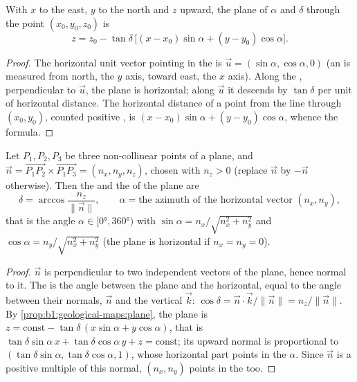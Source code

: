 \begin{proposition}\label{prop:b1:geological-maps:plane}
With $x$ to the east, $y$ to the north and $z$ upward, the plane of  $\alpha$ and  $\delta$ through the point $(x_0, y_0, z_0)$ is
\[
  z = z_0 - \tan\delta\,\bigl[(x - x_0)\sin\alpha + (y - y_0)\cos\alpha\bigr].
\]
\end{proposition}

\begin{proof}
The horizontal unit vector pointing in the  is
$\vec u = (\sin\alpha, \cos\alpha, 0)$ (an  is measured from north,
the $y$ axis, toward east, the $x$ axis). Along the , perpendicular to
$\vec u$, the plane is horizontal; along $\vec u$ it descends by
$\tan\delta$ per unit of horizontal distance. The horizontal distance of a
point from the  line through $(x_0, y_0)$, counted positive ,
is $(x-x_0)\sin\alpha + (y-y_0)\cos\alpha$, whence the formula.
\end{proof}

\begin{theorem}\label{thm:b1:geological-maps:three-point}
Let $P_1, P_2, P_3$ be three non-collinear points of a plane, and
$\vec n = \overrightarrow{P_1P_2} \times \overrightarrow{P_1P_3} =
(n_x, n_y, n_z)$, chosen with $n_z > 0$ (replace $\vec n$ by $-\vec n$
otherwise). Then the  and the  of the plane are
\[
  \delta = \arccos\frac{n_z}{\|\vec n\|}, \qquad
  \alpha = \text{the azimuth of the horizontal vector } (n_x, n_y),
\]
that is the angle $\alpha \in [\ang{0}, \ang{360})$ with
$\sin\alpha = n_x/\sqrt{n_x^2+n_y^2}$ and $\cos\alpha = n_y/\sqrt{n_x^2+n_y^2}$
(the plane is horizontal if $n_x = n_y = 0$).
\end{theorem}

\begin{proof}
$\vec n$ is perpendicular to two independent vectors of the plane, hence
normal to it. The  is the angle between the plane and the horizontal,
equal to the angle between their normals, $\vec n$ and the vertical
$\vec k$: $\cos\delta = \vec n \cdot \vec k / \|\vec n\| = n_z/\|\vec n\|$.
By \cref{prop:b1:geological-maps:plane}, the plane is $z = \text{const} -
\tan\delta\,(x\sin\alpha + y\cos\alpha)$, that is
$\tan\delta\sin\alpha\,x + \tan\delta\cos\alpha\,y + z = \text{const}$; its
upward normal is proportional to $(\tan\delta\sin\alpha,
\tan\delta\cos\alpha, 1)$, whose horizontal part points in the 
$\alpha$. Since $\vec n$ is a positive multiple of this normal, $(n_x, n_y)$
points in the  too.
\end{proof}

